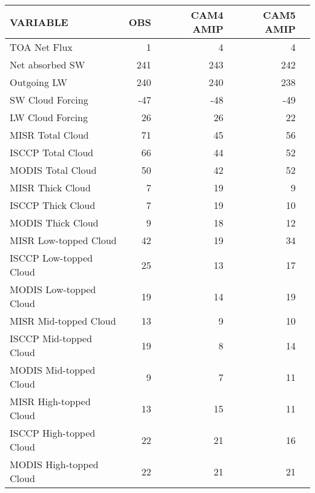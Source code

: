 \begin{tabular}{lrrrr}
\hline
                VARIABLE &                      OBS &                CAM4 AMIP &                CAM5 AMIP \\ \hline
            TOA Net Flux &                        1 &                        4 &                        4 \\
         Net absorbed SW &                      241 &                      243 &                      242 \\
             Outgoing LW &                      240 &                      240 &                      238 \\
        SW Cloud Forcing &                      -47 &                      -48 &                      -49 \\
        LW Cloud Forcing &                       26 &                       26 &                       22 \\
        MISR Total Cloud &                       71 &                       45 &                       56 \\
       ISCCP Total Cloud &                       66 &                       44 &                       52 \\
       MODIS Total Cloud &                       50 &                       42 &                       52 \\
        MISR Thick Cloud &                        7 &                       19 &                        9 \\
       ISCCP Thick Cloud &                        7 &                       19 &                       10 \\
       MODIS Thick Cloud &                        9 &                       18 &                       12 \\
   MISR Low-topped Cloud &                       42 &                       19 &                       34 \\
  ISCCP Low-topped Cloud &                       25 &                       13 &                       17 \\
  MODIS Low-topped Cloud &                       19 &                       14 &                       19 \\
   MISR Mid-topped Cloud &                       13 &                        9 &                       10 \\
  ISCCP Mid-topped Cloud &                       19 &                        8 &                       14 \\
  MODIS Mid-topped Cloud &                        9 &                        7 &                       11 \\
  MISR High-topped Cloud &                       13 &                       15 &                       11 \\
 ISCCP High-topped Cloud &                       22 &                       21 &                       16 \\
 MODIS High-topped Cloud &                       22 &                       21 &                       21 \\ \hline
\end{tabular}
